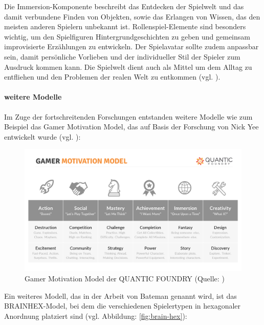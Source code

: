 Die Immersion-Komponente beschreibt das Entdecken der Spielwelt und das damit verbundene Finden von Objekten, sowie das Erlangen von Wissen, das den meisten anderen Spielern unbekannt ist. Rollenspiel-Elemente sind besonders wichtig, um den Spielfiguren Hintergrundgeschichten zu geben und gemeinsam improvisierte Erzählungen zu entwickeln. Der Spielavatar sollte zudem anpassbar sein, damit persönliche Vorlieben und der individueller Stil der Spieler zum Ausdruck kommen kann. Die Spielwelt dient auch als Mittel um dem Alltag zu entfliehen und den Problemen der realen Welt zu entkommen (vgl. \citealp[S. 6]{yee_motivations_2006}).

\paragraph{weitere Modelle}
Im Zuge der fortschreitenden Forschungen entstanden weitere Modelle wie zum Beispiel das Gamer Motivation Model, das auf Basis der Forschung von Nick Yee entwickelt wurde (vgl. \citealp{institut_fur_ludologie_spielertypen_nodate}):

\begin{figure}[ht]
\centering
\includegraphics[width=1\linewidth]{content/pictures/gamer_motivations_model.png}
\caption{Gamer Motivation Model der QUANTIC FOUNDRY (Quelle: \citealp{noauthor_quantic_nodate})}
\label{fig:gamer_motivation_model}
\end{figure}

Ein weiteres Modell, das in der Arbeit von Bateman genannt wird, ist das BRAINHEX-Model, bei dem die verschiedenen Spielertypen in hexagonaler Anordnung platziert sind (vgl. Abbildung: \ref{fig:brain-hex}):

